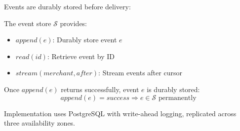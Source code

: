 Events are durably stored before delivery:

\begin{definition}
The event store $\mathcal{S}$ provides:
\begin{itemize}
    \item $append(e)$: Durably store event $e$
    \item $read(id)$: Retrieve event by ID
    \item $stream(merchant, after)$: Stream events after cursor
\end{itemize}
\end{definition}

\begin{theorem}
Once $append(e)$ returns successfully, event $e$ is durably stored:
\[
append(e) = success \Rightarrow e \in \mathcal{S} \text{ permanently}
\]
\end{theorem}

Implementation uses PostgreSQL with write-ahead logging, replicated across three availability zones.

